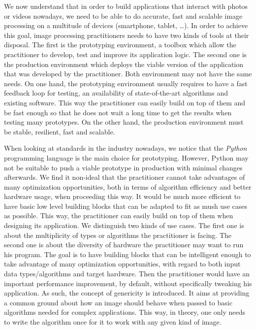 We now understand that in order to build applications that interact with photos or videos nowadays, we need to be able
to do accurate, fast and scalable image processing on a multitude of devices (smartphone, tablet, \ldots). In order to
achieve this goal, image processing practitioners needs to have two kinds of tools at their disposal. The first is the
prototyping environment, a toolbox which allow the practitioner to develop, test and improve its application logic. The
second one is the production environment which deploys the viable version of the application that was developed by the
practitioner. Both environment may not have the same needs. On one hand, the prototyping environment usually requires to
have a fast feedback loop for testing, an availability of state-of-the-art algorithms and existing software. This way
the practitioner can easily build on top of them and be fast enough so that he does not wait a long time to get the
results when testing many prototypes. On the other hand, the production environment must be stable, resilient, fast and
scalable.

When looking at standards in the industry nowadays, we notice that the \emph{Python} programming language is the main
choice for prototyping. However, Python may not be suitable to push a viable prototype in production with minimal
changes afterwards. We find it non-ideal that the practitioner cannot take advantages of many optimization
opportunities, both in terms of algorithm efficiency and better hardware usage, when proceeding this way. It would be
much more efficient to have basic low level building blocks that can be adapted to fit as mush use cases as possible.
This way, the practitioner can easily build on top of them when designing its application. We distinguish two kinds of
use cases. The first one is about the multiplicity of types or algorithms the practitioner is facing. The second one is
about the diversity of hardware the practitioner may want to run his program. The goal is to have building blocks that
can be intelligent enough to take advantage of many optimization opportunities, with regard to both input data
types/algorithms and target hardware. Then the practitioner would have an important performance improvement, by default,
without specifically tweaking his application. As such, the concept of genericity is introduced. It aims at providing a
common ground about how an image should behave when passed to basic algorithms needed for complex applications. This
way, in theory, one only needs to write the algorithm once for it to work with any given kind of image.


